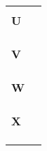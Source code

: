 \begin{longtable}{p{2.5cm}p{9.5cm}}
\\
\\
\huge{\textbf{U}}& \\
\hline
\\

\\
\\
\huge{\textbf{V}}& \\
\hline
\\

\\
\\
\huge{\textbf{W}}& \\
\hline
\\

\\
\\
\huge{\textbf{X}}& \\
\hline
\\

\\
\\
\end{longtable}




